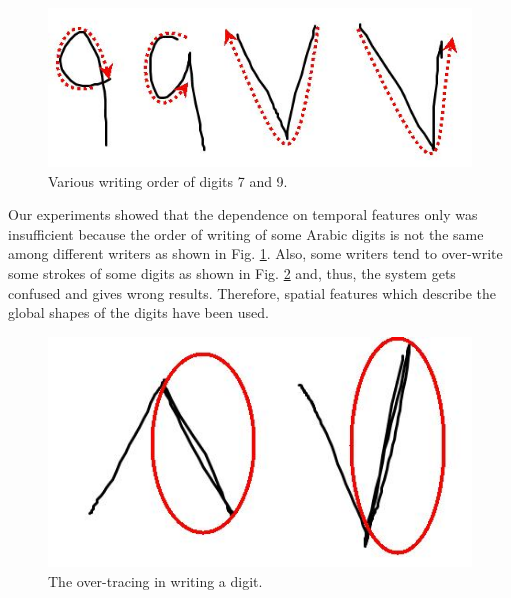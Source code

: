 \documentclass[10pt]{IEEEtran}
\begin{document}
 \begin{figure}
	\centering
		\includegraphics[scale=0.35]{79}
	\caption[ Writing Direction] {Various writing order of digits 7 and 9.}
	\label{fig:direction}
\end{figure}

Our experiments showed that the dependence on temporal features only was insufficient because the order of writing of some Arabic digits is not the same among different writers as shown in Fig. \ref{fig:direction}. Also, some writers tend to over-write some strokes of some digits as shown in Fig. \ref{fig:direction2} and, thus, the system gets confused and gives wrong results. Therefore, spatial features which describe the global shapes of the digits have been used.




 \begin{figure}
	\centering
		\includegraphics[scale=0.35]{direction2.jpg}
	\caption[ Writing Direction] {The over-tracing in writing a digit.}
	\label{fig:direction2}
\end{figure}
\end{document}
